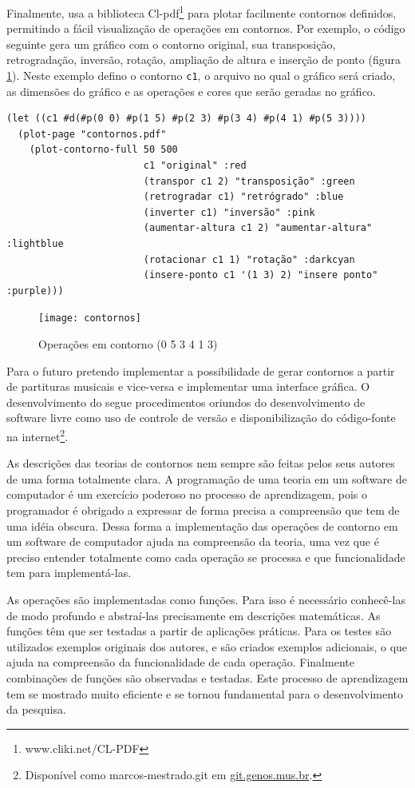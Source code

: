 Finalmente, \goiaba{} usa a biblioteca
Cl-pdf\footnote{www.cliki.net/CL-PDF} para plotar facilmente contornos
definidos, permitindo a fácil visualização de operações em contornos.
Por exemplo, o código seguinte gera um gráfico com o contorno
original, sua transposição, retrogradação, inversão, rotação,
ampliação de altura e inserção de ponto (figura
\ref{fig:operacoes}). Neste exemplo defino o contorno \verb!c1!, o
arquivo no qual o gráfico será criado, as dimensões do gráfico e as
operações e cores que serão geradas no gráfico.

\begin{verbatim}
(let ((c1 #d(#p(0 0) #p(1 5) #p(2 3) #p(3 4) #p(4 1) #p(5 3))))
  (plot-page "contornos.pdf"
    (plot-contorno-full 50 500
                        c1 "original" :red
                        (transpor c1 2) "transposição" :green
                        (retrogradar c1) "retrógrado" :blue
                        (inverter c1) "inversão" :pink
                        (aumentar-altura c1 2) "aumentar-altura" :lightblue
                        (rotacionar c1 1) "rotação" :darkcyan
                        (insere-ponto c1 '(1 3) 2) "insere ponto" :purple)))
\end{verbatim}

\begin{figure}
  \centering
  \texttt{[image: contornos]}
  \caption{Operações em contorno (0 5 3 4 1 3)}
  \label{fig:operacoes}
\end{figure}

Para o futuro pretendo implementar a possibilidade de gerar contornos
a partir de partituras musicais e vice-versa e implementar uma
interface gráfica. O desenvolvimento do \goiaba{} segue procedimentos
oriundos do desenvolvimento de software livre como uso de controle de
versão e disponibilização do código-fonte na
internet\footnote{Disponível como marcos-mestrado.git em
  \url{git.genos.mus.br}.}.

As descrições das teorias de contornos nem sempre são feitas pelos
seus autores de uma forma totalmente clara. A programação de uma
teoria em um software de computador é um exercício poderoso no
processo de aprendizagem, pois o programador é obrigado a expressar de
forma precisa a compreensão que tem de uma idéia obscura. Dessa forma
a implementação das operações de contorno em um software de computador
ajuda na compreensão da teoria, uma vez que é preciso entender
totalmente como cada operação se processa e que funcionalidade tem
para implementá-las.

As operações são implementadas como funções. Para isso é necessário
conhecê-las de modo profundo e abstraí-las precisamente em descrições
matemáticas. As funções têm que ser testadas a partir de aplicações
práticas. Para os testes são utilizados exemplos originais dos
autores, e são criados exemplos adicionais, o que ajuda na compreensão
da funcionalidade de cada operação. Finalmente combinações de funções
são observadas e testadas. Este processo de aprendizagem tem se
mostrado muito eficiente e se tornou fundamental para o
desenvolvimento da pesquisa.

